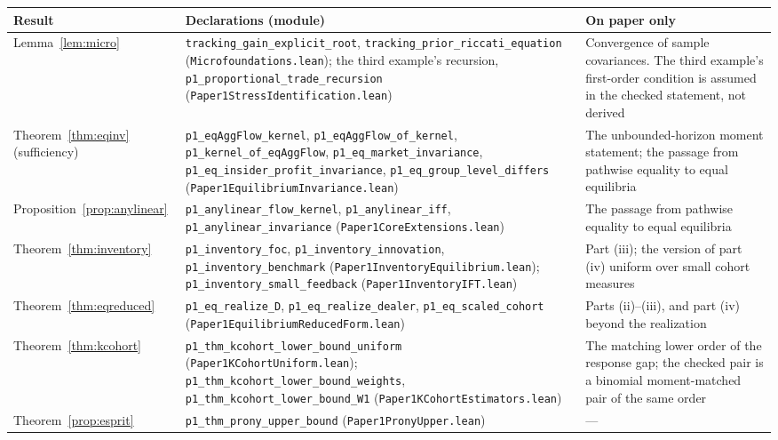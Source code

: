 \begin{longtable}{>{\raggedright\arraybackslash}p{}>{\raggedright\arraybackslash}p{}>{\raggedright\arraybackslash}p{}}
\toprule
Result & Declarations (module) & On paper only\\
\midrule
\endhead
Lemma~\ref{lem:micro} & \texttt{tracking\_gain\_explicit\_root}, \texttt{tracking\_prior\_riccati\_equation} (\nolinkurl{Microfoundations.lean}); the third example's recursion, \texttt{p1\_proportional\_trade\_recursion} (\nolinkurl{Paper1StressIdentification.lean}) & Convergence of sample covariances. The third example's first-order condition is assumed in the checked statement, not derived\\
Theorem~\ref{thm:eqinv} (sufficiency) & \texttt{p1\_eqAggFlow\_kernel}, \texttt{p1\_eqAggFlow\_of\_kernel}, \texttt{p1\_kernel\_of\_eqAggFlow}, \texttt{p1\_eq\_market\_invariance}, \texttt{p1\_eq\_insider\_profit\_invariance}, \texttt{p1\_eq\_group\_level\_differs} (\nolinkurl{Paper1EquilibriumInvariance.lean}) & The unbounded-horizon moment statement; the passage from pathwise equality to equal equilibria\\
Proposition~\ref{prop:anylinear} & \texttt{p1\_anylinear\_flow\_kernel}, \texttt{p1\_anylinear\_iff}, \texttt{p1\_anylinear\_invariance} (\nolinkurl{Paper1CoreExtensions.lean}) & The passage from pathwise equality to equal equilibria\\
Theorem~\ref{thm:inventory} & \texttt{p1\_inventory\_foc}, \texttt{p1\_inventory\_innovation}, \texttt{p1\_inventory\_benchmark} (\nolinkurl{Paper1InventoryEquilibrium.lean}); \texttt{p1\_inventory\_small\_feedback} (\nolinkurl{Paper1InventoryIFT.lean}) & Part (iii); the version of part (iv) uniform over small cohort measures\\
Theorem~\ref{thm:eqreduced} & \texttt{p1\_eq\_realize\_D}, \texttt{p1\_eq\_realize\_dealer}, \texttt{p1\_eq\_scaled\_cohort} (\nolinkurl{Paper1EquilibriumReducedForm.lean}) & Parts (ii)--(iii), and part (iv) beyond the realization\\
Theorem~\ref{thm:kcohort} & \texttt{p1\_thm\_kcohort\_lower\_bound\_uniform} (\nolinkurl{Paper1KCohortUniform.lean}); \texttt{p1\_thm\_kcohort\_lower\_bound\_weights}, \texttt{p1\_thm\_kcohort\_lower\_bound\_W1} (\nolinkurl{Paper1KCohortEstimators.lean}) & The matching lower order of the response gap; the checked pair is a binomial moment-matched pair of the same order\\
Theorem~\ref{prop:esprit} & \texttt{p1\_thm\_prony\_upper\_bound} (\nolinkurl{Paper1PronyUpper.lean}) & ---\\

\end{longtable}
